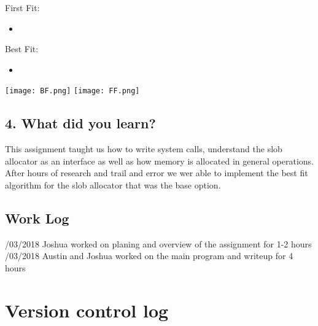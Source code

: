 \documentclass[onecolumn, draftclsnofoot,10pt, compsoc]{IEEEtran}
\begin{document}
	\noindent First Fit:
	\begin{itemize}
	\item 
		\begin{lstlisting}

		\end{lstlisting}
	\end{itemize}

	\nodindent Best Fit:

	\begin{itemize}
	\item 
		\begin{lstlisting}

		\end{lstlisting}
	\end{itemize}


	\texttt{[image: BF.png]}
	\texttt{[image: FF.png]}

	\subsection*{4. What did you learn?}
	This assignment taught us how to write system calls, understand the slob allocator as an interface as well as how memory 
	is allocated in general operations. After hours of research and trail and error we wer able to implement the best fit algorithm for the slob allocator that was the 
	base option. 
	

\begin{center}
\section*{Work Log}
/03/2018 Joshua worked on planing and overview of the assignment for 1-2 hours
/03/2018 Austin and Joshua worked on the main program and writeup for 4 hours 
\end{center}

\section*{Version control log}




\end{document}

